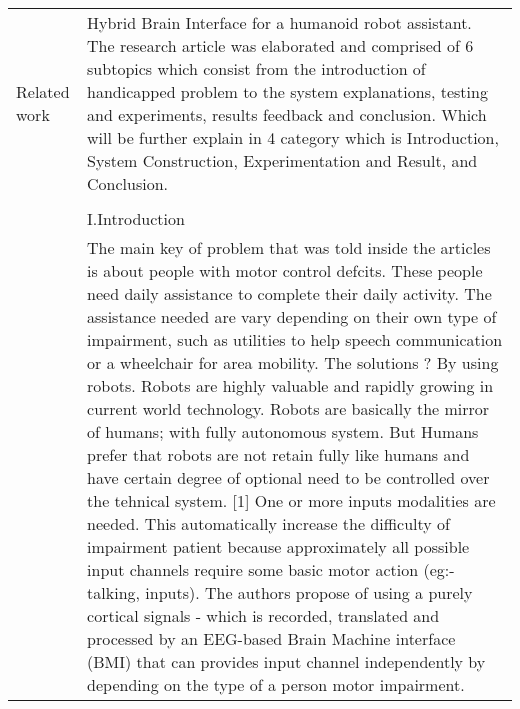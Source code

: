 \documentclass[a4paper, 12pt]{article}
\begin{document}
\begin{tabular}{| m{12em} | m{28em} |}
Related work & 
Hybrid Brain Interface for a humanoid robot assistant. The research article was elaborated 
and comprised of 6 subtopics which consist from the introduction of handicapped problem to 
the system explanations, testing and experiments, results feedback and conclusion. Which 
will be further explain in 4 category which is Introduction, System Construction, 
Experimentation and Result, and Conclusion. \\
& \\
& I.Introduction\\
& The main key of problem that was told inside the articles is about people with motor 
control defcits. These people need daily assistance to complete their daily activity. The 
assistance needed are vary depending on their own type of impairment, such as utilities to 
help speech communication or a wheelchair for area mobility. The solutions ? By using 
robots. Robots are highly valuable and rapidly growing in current world technology. Robots 
are basically the mirror of humans; with fully autonomous system. But Humans prefer that 
robots are not retain fully like humans and have certain degree of optional need to be 
controlled over the tehnical system. [1] One or more inputs modalities are needed. This 
automatically increase the difficulty of impairment patient because approximately all 
possible input channels require some basic motor action (eg:- talking, inputs). The 
authors propose of using a purely cortical signals - which is recorded, translated and 
processed by an EEG-based Brain Machine interface (BMI) that can provides input channel 
independently by depending on the type of a person motor impairment. 
\\



\hline



\end{tabular}
\end{document}
